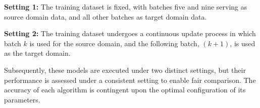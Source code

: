 \documentclass[a4paper]{cas-sc}
\begin{document}
\textbf{Setting 1:} The training dataset is fixed, with batches five and nine serving as source domain data, and all other batches as target domain data.


\textbf{Setting 2:} The training dataset undergoes a continuous update process in which batch $k$ is used for the source domain, and the following batch, $(k + 1)$, is used as the target domain.





Subsequently, these models are executed under two distinct settings, but their performance is assessed under a consistent setting to enable fair comparison. The accuracy of each algorithm is contingent upon the optimal configuration of its parameters.

\end{document}
